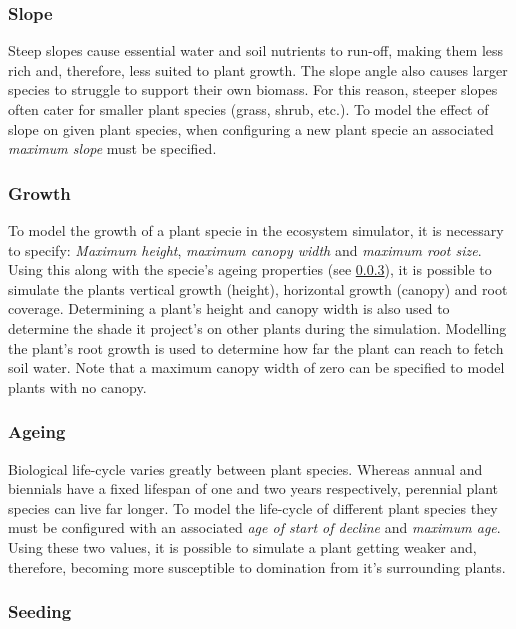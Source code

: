 \subsubsection{Slope}

Steep slopes cause essential water and soil nutrients to run-off, making them less rich and, therefore, less suited to plant growth. The slope angle also causes larger species to struggle to support their own biomass. For this reason, steeper slopes often cater for smaller plant species (grass, shrub, etc.). To model the effect of slope on given plant species, when configuring a new plant specie an associated \textit{maximum slope} must be specified.

\subsubsection{Growth}

To model the growth of a plant specie in the ecosystem simulator, it is necessary to specify: \textit{Maximum height}, \textit{maximum canopy width} and \textit{maximum root size}. Using this along with the specie's ageing properties (see \ref{subsubsec:ageing_properties}), it is possible to simulate the plants vertical growth (height), horizontal growth (canopy) and root coverage. Determining a plant's height and canopy width is also used to determine the shade it project's on other plants during the simulation. Modelling the plant's root growth is used to determine how far the plant can reach to fetch soil water. Note that a maximum canopy width of zero can be specified to model plants with no canopy.

\subsubsection{Ageing} \label{subsubsec:ageing_properties}

Biological life-cycle varies greatly between plant species. Whereas annual and biennials have a fixed lifespan of one and two years respectively, perennial plant species can live far longer. To model the life-cycle of different plant species they must be configured with an associated \textit{age of start of decline} and \textit{maximum age}. Using these two values, it is possible to simulate a plant getting weaker and, therefore, becoming more susceptible to domination from it's surrounding plants.

\subsubsection{Seeding}

